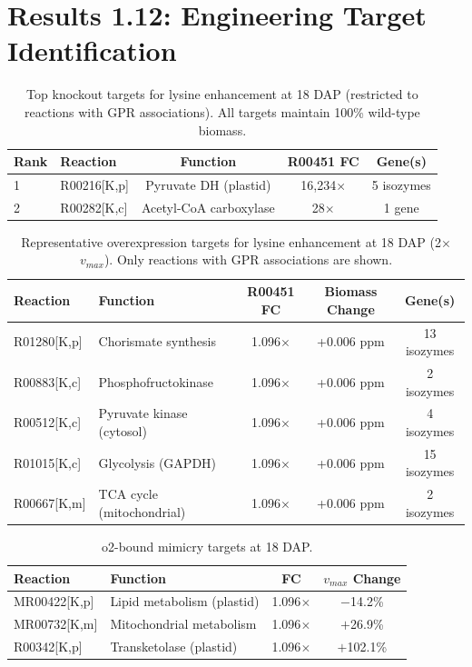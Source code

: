 \documentclass[11pt,letterpaper]{article}
\begin{document}
\clearpage


\section{Results 1.12: Engineering Target Identification}

\begin{table}[H]
\centering
\caption{Top knockout targets for lysine enhancement at 18 DAP (restricted to reactions with GPR associations). All targets maintain 100\% wild-type biomass.}
\label{stab:ko_targets}
\small
\begin{tabular}{llccc}
\toprule
Rank & Reaction & Function & R00451 FC & Gene(s) \\
\midrule
1 & R00216[K,p] & Pyruvate DH (plastid) & 16,234$\times$ & 5 isozymes \\
2 & R00282[K,c] & Acetyl-CoA carboxylase & 28$\times$ & 1 gene \\
\bottomrule
\end{tabular}
\end{table}

\clearpage

\begin{table}[H]
\centering
\caption{Representative overexpression targets for lysine enhancement at 18 DAP (2$\times$ $v_{max}$). Only reactions with GPR associations are shown.}
\label{stab:oe_targets}
\small
\begin{tabular}{llccc}
\toprule
Reaction & Function & R00451 FC & Biomass Change & Gene(s) \\
\midrule
R01280[K,p] & Chorismate synthesis & 1.096$\times$ & +0.006 ppm & 13 isozymes \\
R00883[K,c] & Phosphofructokinase & 1.096$\times$ & +0.006 ppm & 2 isozymes \\
R00512[K,c] & Pyruvate kinase (cytosol) & 1.096$\times$ & +0.006 ppm & 4 isozymes \\
R01015[K,c] & Glycolysis (GAPDH) & 1.096$\times$ & +0.006 ppm & 15 isozymes \\
R00667[K,m] & TCA cycle (mitochondrial) & 1.096$\times$ & +0.006 ppm & 2 isozymes \\
\bottomrule
\end{tabular}
\end{table}

\clearpage

\begin{table}[H]
\centering
\caption{o2-bound mimicry targets at 18 DAP.}
\label{stab:mim_targets}
\small
\begin{tabular}{llcc}
\toprule
Reaction & Function & FC & $v_{max}$ Change \\
\midrule
MR00422[K,p] & Lipid metabolism (plastid) & 1.096$\times$ & $-$14.2\% \\
MR00732[K,m] & Mitochondrial metabolism & 1.096$\times$ & $+$26.9\% \\
R00342[K,p] & Transketolase (plastid) & 1.096$\times$ & $+$102.1\% \\
\bottomrule
\end{tabular}
\end{table}
\end{document}
